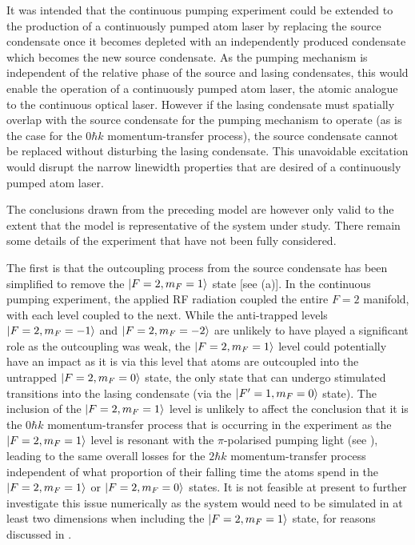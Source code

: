 It was intended that the continuous pumping experiment could be extended to the production of a continuously pumped atom laser by replacing the source condensate once it becomes depleted with an independently produced condensate which becomes the new source condensate.  As the pumping mechanism is independent of the relative phase of the source and lasing condensates, this would enable the operation of a continuously pumped atom laser, the atomic analogue to the continuous optical laser.  However if the lasing condensate must spatially overlap with the source condensate for the pumping mechanism to operate (as is the case for the $0 \hbar k$ momentum-transfer process), the source condensate cannot be replaced without disturbing the lasing condensate.  This unavoidable excitation would disrupt the narrow linewidth properties that are desired of a continuously pumped atom laser.

The conclusions drawn from the preceding model are however only valid to the extent that the model is representative of the system under study.  There remain some details of the experiment that have not been fully considered.

The first is that the outcoupling process from the source condensate has been simplified to remove the ${\left|F=2, m_F = 1\right>}$ state [see (a)].  In the continuous pumping experiment, the applied RF radiation coupled the entire $F=2$ manifold, with each level coupled to the next.  While the anti-trapped levels ${\left|F=2, m_F=-1\right>}$ and ${\left|F=2, m_F=-2\right>}$ are unlikely to have played a significant role as the outcoupling was weak, the ${\left|F=2, m_F=1\right>}$ level could potentially have an impact as it is via this level that atoms are outcoupled into the untrapped ${\left|F=2, m_F=0\right>}$ state, the only state that can undergo stimulated transitions into the lasing condensate (via the ${\left|F'=1, m_F=0\right>}$ state).  The inclusion of the ${\left|F=2, m_F=1\right>}$ level is unlikely to affect the conclusion that it is the $0 \hbar k$ momentum-transfer process that is occurring in the experiment as the ${\left|F=2, m_F=1\right>}$ level is resonant with the $\pi$-polarised pumping light (see ), leading to the same overall losses for the $2 \hbar k$ momentum-transfer process independent of what proportion of their falling time the atoms spend in the ${\left|F=2, m_F=1\right>}$ or ${\left|F=2, m_F=0\right>}$ states.  It is not feasible at present to further investigate this issue numerically as the system would need to be simulated in at least two dimensions when including the ${\left|F=2, m_F=1\right>}$ state, for reasons discussed in .


